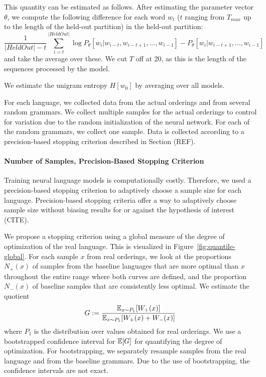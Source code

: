 This quantity can be estimated as follows.
After estimating the parameter vector $\theta$, we compute the following difference for each word $w_t$ ($t$ ranging from $T_{max}$ up to the length of the held-out partition) in the held-out partition:
\begin{equation}
	\frac{1}{|HeldOut|-t} \sum_{i=t}^{|HeldOut|} \log P_\theta[w_i | w_{i-t}, w_{i-t+1}, ..., w_{i-1}] - P_\theta[w_i | w_{i-t+1}, ..., w_{i-1}]
\end{equation}
and take the average over these.
We cut $T$ off at 20, as this is the length of the sequences processed by the model.


We estimate the unigram entropy $H[w_0]$ by averaging over all models.

For each language, we collected data from the actual orderings and from several random grammars.
We collect multiple samples for the actual orderings to control for variation due to the random initialization of the neural network.
For each of the random grammars, we collect one sample.
Data is collected according to a precision-based stopping criterion described in Section (REF).


\paragraph{Number of Samples, Precision-Based Stopping Criterion}
Training neural language models is computationally costly.
Therefore, we used a precision-based stopping criterion to adaptively choose a sample size for each language.
Precision-based stopping criteria offer a way to adaptively choose sample size without biasing results for or against the hypothesis of interest (CITE).

We propose a stopping criterion using a global measure of the degree of optimization of the real language.
This is visualized in Figure~\ref{fig:quantile-global}.
For each sample $x$ from real orderings, we look at the proportions $N_+(x)$ of samples from the baseline languages that are more optimal than $x$ throughout the entire range where both curves are defined, and the proportion $N_-(x)$ of baseline samples that are consistently less optimal.
We estimate the quotient
\begin{equation}\label{eq:g}
	G :=	\frac{\mathbb{E}_{x \sim P_1}[W_+(x)]}{\mathbb{E}_{x \sim P_1}[W_+(x) + W_-(x)]}
\end{equation}
where $P_1$ is the distribution over values obtained for real orderings.
We use a bootstrapped confidence interval for $\mathbb{E}[G]$ for quantifying the degree of optimization.
For bootstrapping, we separately resample samples from the real language and from the baseline grammars.
Due to the use of bootstrapping, the confidence intervals are not exact.

